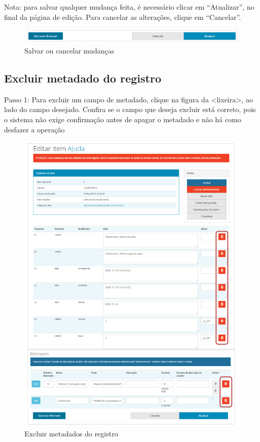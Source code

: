 \documentclass[12pt,hidelinks]{article}
\begin{document}
\newpage
    
    Nota: para salvar qualquer mudança feita, é necessário clicar em “Atualizar”, no final da página de edição. Para cancelar as alterações, clique em “Cancelar”.
    
    \begin{figure}[!htp]
                \centering
                \includegraphics[scale=0.8]{figura/Figura91.png}
                \caption{Salvar ou cancelar mudanças}
            \label{Rotulo}
        \end{figure}
    
    \subsection{Excluir metadado do registro}
    
    \singlespacing
    
    Passo 1: Para excluir um campo de metadado, clique na figura da <lixeira>, ao lado do campo desejado. Confira se o campo que deseja excluir está correto, pois o sistema não exige confirmação antes de apagar o metadado e não há como desfazer a operação
    
    \begin{figure}[!htp]
                \centering
                \includegraphics[scale=0.7]{figura/Figura92.png}
                \caption{Excluir metadados do registro}
            \label{Rotulo}
        \end{figure}
    
\end{document}
